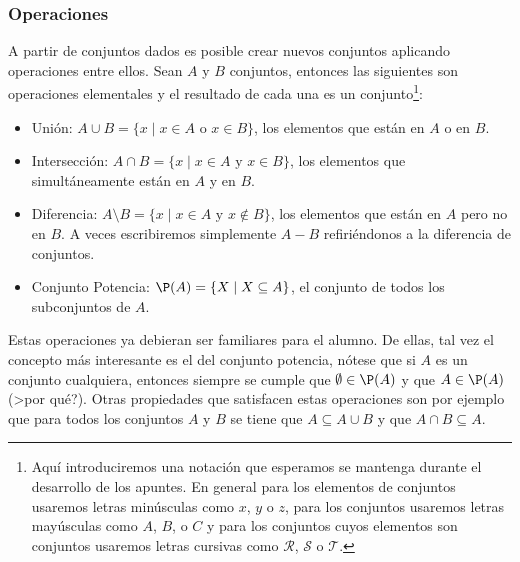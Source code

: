 \subsubsection*{Operaciones}
A partir de conjuntos dados es posible crear nuevos conjuntos aplicando operaciones entre ellos.
Sean $A$ y $B$ conjuntos, entonces las siguientes son operaciones elementales y el resultado de cada una es un conjunto\footnote{Aquí introduciremos una notación que esperamos se mantenga durante el desarrollo de los apuntes. En general para los elementos de conjuntos usaremos letras minúsculas como $x$, $y$ o $z$, para los conjuntos usaremos letras mayúsculas como $A$, $B$, o $C$ y para los conjuntos cuyos elementos son conjuntos usaremos letras cursivas como $\mathcal{R}$, $\mathcal{S}$ o $\mathcal{T}$.}:
\begin{itemize}
  \itemsep 0pt
  \item Unión: $A\cup B=\{x\;|\;x\in A\text{ o } x\in B\}$, los elementos que están en $A$ o en $B$.
  \item Intersección: $A\cap B=\{x\;|\;x\in A\text{ y } x\in B\}$, los elementos que simultáneamente están en $A$ y en $B$.
  \item Diferencia: $A\setminus B=\{x\;|\;x\in A\text{ y } x\notin B\}$, los elementos que están en $A$ pero no en $B$. 
  A veces escribiremos simplemente $A-B$ refiriéndonos a la diferencia de conjuntos.
  \item Conjunto Potencia: $\P(A)=\{X\;|\;X\subseteq A\}$, el conjunto de todos los subconjuntos de $A$.
\end{itemize}

Estas operaciones ya debieran ser familiares para el alumno.
De ellas, tal vez el concepto más interesante es el del conjunto potencia, nótese que si $A$ es un conjunto cualquiera, entonces siempre se cumple que $\emptyset\in\P(A)$ y que $A\in\P(A)$ (>por qué?).
Otras propiedades que satisfacen estas operaciones son por ejemplo que para todos los conjuntos $A$ y $B$ se tiene que $A\subseteq A\cup B$ y que $A\cap B\subseteq A$.

